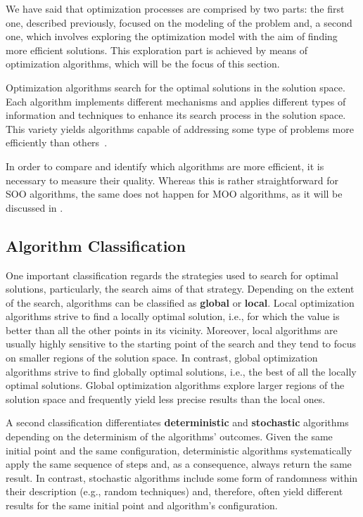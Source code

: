 	We have said that optimization processes are comprised by two parts: the first one, described previously, focused on the modeling of the problem and, a second one, which involves exploring the optimization model with the aim of finding more efficient solutions. This exploration part is achieved by means of optimization algorithms, which will be the focus of this section. 
	
	Optimization algorithms search for the optimal solutions in the solution space. Each algorithm implements different mechanisms and applies different types of information and techniques to enhance its search process in the solution space. This variety yields algorithms capable of addressing some type of problems more efficiently than others~\cite{Wolpert1997NFLT}.
	
	In order to compare and identify which algorithms are more efficient, it is necessary to measure their quality. Whereas this is rather straightforward for \ac{SOO} algorithms, the same does not happen for \ac{MOO} algorithms, as it will be discussed in .
	
	\subsection{Algorithm Classification}
	
	
	One important classification regards the strategies used to search for optimal solutions, particularly, the search aims of that strategy. Depending on the extent of the search, algorithms can be classified as \textbf{global} or \textbf{local}. Local optimization algorithms strive to find a locally optimal solution, i.e., for which the value is better than all the other points in its vicinity. Moreover, local algorithms are usually highly sensitive to the starting point of the search and they tend to focus on smaller regions of the solution space. In contrast, global optimization algorithms strive to find globally optimal solutions, i.e., the best of all the locally optimal solutions. Global optimization algorithms explore larger regions of the solution space and frequently yield less precise results than the local ones.
		
	A second classification differentiates \textbf{deterministic} and \textbf{stochastic} algorithms depending on the determinism of the algorithms' outcomes. Given the same initial point and the same configuration, deterministic algorithms systematically apply the same sequence of steps and, as a consequence, always return the same result. In contrast, stochastic algorithms include some form of randomness within their description (e.g., random techniques) and, therefore, often yield different results for the same initial point and algorithm's configuration.
		
